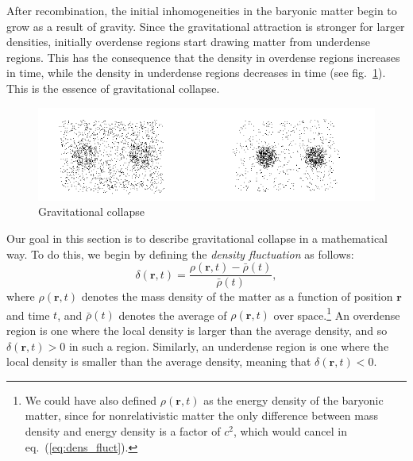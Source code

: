 \documentclass[11pt, a4paper,oneside,openright]{book}
\numberwithin{equation}{section}
\begin{document}
After recombination, the initial inhomogeneities in the baryonic matter begin to grow as a result of gravity. Since the gravitational attraction is stronger for larger densities, initially overdense regions start drawing matter from underdense regions. This has the consequence that the density in overdense regions increases in time, while the density in underdense regions decreases in time (see fig.\ \ref{fig:lec8_3}). This is the essence of gravitational collapse.
\begin{figure}[ht]
\begin{center}
\includegraphics[scale=0.8]{Draw/lec8_3.png}
\end{center}
\caption{Gravitational collapse}
\label{fig:lec8_3}
\end{figure}

Our goal in this section is to describe gravitational collapse in a mathematical way. To do this, we begin by defining the {\it density fluctuation} as follows:
\begin{equation} \label{eq:dens_fluct}
\delta(\mathbf{r},t)=\frac{\rho(\mathbf{r},t)-\bar{\rho}(t)}{\bar{\rho}(t)},
\end{equation}
where $\rho(\mathbf{r},t)$ denotes the mass density of the matter as a function of position $\mathbf{r}$ and time $t$, and $\bar{\rho}(t)$ denotes the average of $\rho(\mathbf{r},t)$ over space.\footnote{We could have also defined $\rho(\mathbf{r},t)$ as the energy density of the baryonic matter, since for nonrelativistic matter the only difference between mass density and energy density is a factor of $c^2$, which would cancel in eq.\ (\ref{eq:dens_fluct}).} An overdense region is one where the local density is larger than the average density, and so $\delta(\mathbf{r},t)>0$ in such a region. Similarly, an underdense region is one where the local density is smaller than the average density, meaning that $\delta(\mathbf{r},t)<0$.
\end{document}
